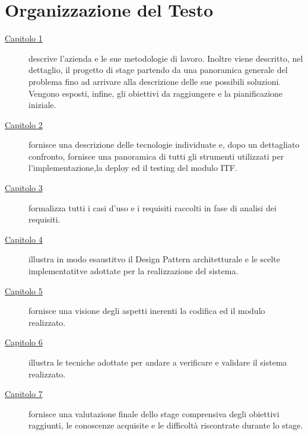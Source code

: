 
\cleardoublepage
{}
{}
\begingroup
\let\clearpage\relax
\let\cleardoublepage\relax
\let\cleardoublepage\relax

\chapter*{Organizzazione del Testo}

\begin{description}
	\item[{\hyperref[cap:introduzione]{Capitolo 1}}] descrive l'azienda e le sue metodologie di lavoro. Inoltre viene descritto, nel dettaglio, il progetto di stage partendo da una panoramica generale del problema fino ad arrivare alla descrizione delle sue possibili soluzioni. Vengono esposti, infine, gli obiettivi da raggiungere e la pianificazione iniziale.
	
	\item[{\hyperref[cap:tecnologie_e_strumenti]{Capitolo 2}}] fornisce una descrizione delle tecnologie individuate e, dopo un dettagliato confronto, fornisce una panoramica di tutti gli strumenti utilizzati per l'implementazione,la deploy ed il testing del modulo ITF. 
	
	\item[{\hyperref[cap:analisi-requisiti]{Capitolo 3}}] formalizza tutti i casi d'uso e i requisiti raccolti in fase di analisi dei requisiti.
	
	\item[{\hyperref[cap:progettazione]{Capitolo 4}}] illustra in modo esaustitvo il Design Pattern architetturale e le scelte implementatitve adottate per la realizzazione del sistema.
	
	\item[{\hyperref[cap:codifica]{Capitolo 5}}] fornisce una visione degli aspetti inerenti la codifica ed il modulo realizzato.
	
	\item[{\hyperref[cap:verifica_validazione]{Capitolo 6}}] illustra le tecniche adottate per andare a verificare e validare il sistema realizzato.
	
	\item[{\hyperref[cap:valutazione_finale]{Capitolo 7}}] fornisce una valutazione finale dello stage comprensiva degli obiettivi raggiunti, le conoscenze acquisite e le difficoltà riscontrate durante lo stage.
	
\end{description}

